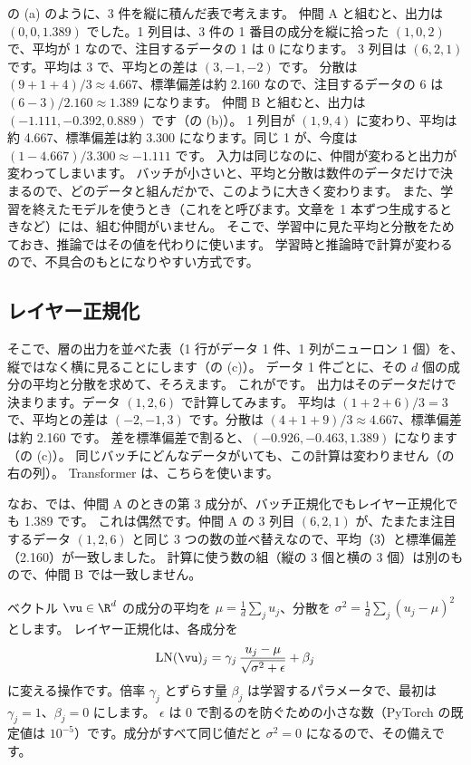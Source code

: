 の (a) のように、3 件を縦に積んだ表で考えます。
仲間 A と組むと、出力は $(0, 0, 1.389)$ でした。1 列目は、3 件の 1 番目の成分を縦に拾った $(1,0,2)$ で、平均が 1 なので、注目するデータの 1 は 0 になります。
3 列目は $(6,2,1)$ です。平均は 3 で、平均との差は $(3,-1,-2)$ です。
分散は $(9+1+4)/3\approx4.667$、標準偏差は約 2.160 なので、注目するデータの 6 は $(6-3)/2.160\approx1.389$ になります。
仲間 B と組むと、出力は $(-1.111, -0.392, 0.889)$ です（の (b)）。
1 列目が $(1,9,4)$ に変わり、平均は約 4.667、標準偏差は約 3.300 になります。同じ 1 が、今度は $(1-4.667)/3.300\approx-1.111$ です。
入力は同じなのに、仲間が変わると出力が変わってしまいます。
バッチが小さいと、平均と分散は数件のデータだけで決まるので、どのデータと組んだかで、このように大きく変わります。
また、学習を終えたモデルを使うとき（これをと呼びます。文章を 1 本ずつ生成するときなど）には、組む仲間がいません。
そこで、学習中に見た平均と分散をためておき、推論ではその値を代わりに使います。
学習時と推論時で計算が変わるので、不具合のもとになりやすい方式です。

\subsection*{レイヤー正規化}

そこで、層の出力を並べた表（1 行がデータ 1 件、1 列がニューロン 1 個）を、縦ではなく横に見ることにします（の (c)）。
データ 1 件ごとに、その $d$ 個の成分の平均と分散を求めて、そろえます。
これがです\cite{ba2016layer}。
出力はそのデータだけで決まります。データ $(1,2,6)$ で計算してみます。
平均は $(1+2+6)/3=3$ で、平均との差は $(-2,-1,3)$ です。分散は $(4+1+9)/3\approx4.667$、標準偏差は約 2.160 です。
差を標準偏差で割ると、$(-0.926,-0.463,1.389)$ になります（の (c)）。
同じバッチにどんなデータがいても、この計算は変わりません（の右の列）。
Transformer は、こちらを使います。

なお、では、仲間 A のときの第 3 成分が、バッチ正規化でもレイヤー正規化でも 1.389 です。
これは偶然です。仲間 A の 3 列目 $(6,2,1)$ が、たまたま注目するデータ $(1,2,6)$ と同じ 3 つの数の並べ替えなので、平均（3）と標準偏差（2.160）が一致しました。
計算に使う数の組（縦の 3 個と横の 3 個）は別のもので、仲間 B では一致しません。

\begin{definition}[レイヤー正規化]
ベクトル $\vu\in\R^{d}$ の成分の平均を $\mu=\frac{1}{d}\sum_{j}u_j$、分散を $\sigma^2=\frac{1}{d}\sum_{j}(u_j-\mu)^2$ とします。
レイヤー正規化は、各成分を
\begin{equation}
\mathrm{LN}(\vu)_j=\gamma_j\,\frac{u_j-\mu}{\sqrt{\sigma^2+\epsilon}}+\beta_j
\label{eq:training-layernorm}
\end{equation}
に変える操作です。倍率 $\gamma_j$ とずらす量 $\beta_j$ は学習するパラメータで、最初は $\gamma_j=1$、$\beta_j=0$ にします。
$\epsilon$ は 0 で割るのを防ぐための小さな数（PyTorch の既定値は $10^{-5}$）です。成分がすべて同じ値だと $\sigma^2=0$ になるので、その備えです。
\end{definition}

